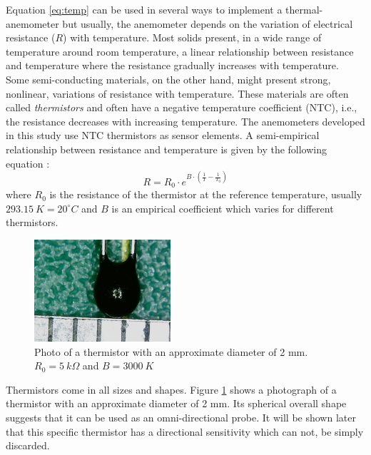 \documentclass[10pt,fleqn,a4paper,twoside]{article}
\begin{document}
Equation \ref{eq:temp} can be used in several ways to implement a thermal-anemometer but usually, the anemometer depends on the variation of electrical resistance ($R$) with temperature. Most solids present, in a wide range of temperature around room temperature, a linear relationship between resistance and temperature where the resistance gradually increases with temperature. Some semi-conducting materials, on the other hand, might present strong, nonlinear, variations of resistance with temperature. These materials are often called \emph{thermistors} and often have a negative temperature coefficient (NTC), i.e., the resistance decreases with increasing temperature. The anemometers developed in this study use NTC thermistors as sensor elements. A semi-empirical relationship between resistance and temperature is given by the following equation \citep{Sandborn72}:
\begin{equation}
  R = R_0 \cdot e^{B\cdot\left(\frac{1}{T} - \frac{1}{T_0} \right)}
  \label{eq:thermistor}
\end{equation}
where $R_0$ is the resistance of the thermistor at the reference temperature, usually $293.15\:K = 20^\circ C$ and $B$ is an empirical coefficient which varies for different thermistors.

\begin{figure}[h!]
\centering
\includegraphics[width=0.45\textwidth]{../../figures/termistor.jpg}
\caption{Photo of a thermistor with an approximate diameter of 2 mm. $R_0 = 5\:k\Omega$ and $B = 3000\:K$}
\label{fig:thermistor}
\end{figure}

Thermistors come in all sizes and shapes. Figure \ref{fig:thermistor} shows a photograph of a thermistor with an approximate diameter of 2 mm. Its spherical overall shape suggests that it can be used as an omni-directional probe. It will be shown later that this specific thermistor has a directional sensitivity which can not, be simply discarded.
\end{document}
